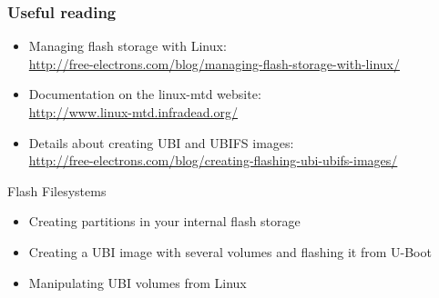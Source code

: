 \begin{frame}
  \frametitle{Useful reading}
  \begin{itemize}
  \item Managing flash storage with Linux:\\
    \url{http://free-electrons.com/blog/managing-flash-storage-with-linux/}
  \item Documentation on the linux-mtd website:\\
    \url{http://www.linux-mtd.infradead.org/}
  \item Details about creating UBI and UBIFS images:\\
    \url{http://free-electrons.com/blog/creating-flashing-ubi-ubifs-images/}
  \end{itemize}
\end{frame}

\setuplabframe
{Flash Filesystems}
{
  \begin{itemize}
  \item Creating partitions in your internal flash storage
  \item Creating a UBI image with several volumes and flashing it from
    U-Boot
  \item Manipulating UBI volumes from Linux
  \end{itemize}
}
